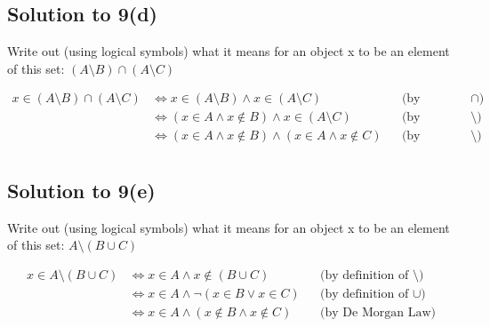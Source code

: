 \documentclass{scrartcl}
\begin{document}
    \subsection*{Solution to 9(d)}
        Write out (using logical symbols) what it means for an object x to be an element of this set: $(A \setminus B) \cap (A \setminus C)$

        \begin{align*}
            x \in (A \setminus B) \cap (A \setminus C)
            &\Leftrightarrow x \in (A \setminus B) \wedge x \in (A \setminus C)
            && \text{(by definition of $\cap$)} \\
            &\Leftrightarrow (x \in A \wedge x \notin B) \wedge x \in (A \setminus C)
            && \text{(by definition of $\setminus$)} \\
            &\Leftrightarrow (x \in A \wedge x \notin B) \wedge (x \in A \wedge x \notin C)
            && \text{(by definition of $\setminus$)} \\
        \end{align*}

    \subsection*{Solution to 9(e)}
        Write out (using logical symbols) what it means for an object x to be an element of this set: $A \setminus (B \cup C)$

        \begin{align*}
            x \in A \setminus (B \cup C)
            &\Leftrightarrow x \in A \wedge x \notin (B \cup C)
            && \text{(by definition of $\setminus$)} \\
            &\Leftrightarrow x \in A \wedge \neg (x \in B \vee x \in C)
            && \text{(by definition of $\cup$)} \\
            &\Leftrightarrow x \in A \wedge (x \notin B \wedge x \notin C)
            && \text{(by De Morgan Law)} \\
        \end{align*}
\end{document}
